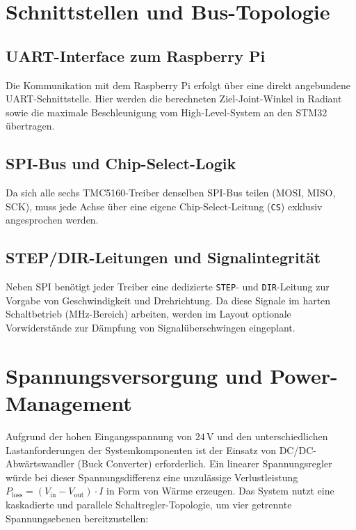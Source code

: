 \section{Schnittstellen und Bus-Topologie}
\label{subsec:schnittstellen}

\subsection{UART-Interface zum Raspberry Pi}
Die Kommunikation mit dem Raspberry Pi erfolgt über eine direkt angebundene UART-Schnittstelle. Hier werden die berechneten Ziel-Joint-Winkel in Radiant sowie die maximale Beschleunigung vom High-Level-System an den STM32 übertragen.

\subsection{SPI-Bus und Chip-Select-Logik}
Da sich alle sechs TMC5160-Treiber denselben SPI-Bus teilen (MOSI, MISO, SCK), muss jede Achse über eine eigene Chip-Select-Leitung (\texttt{CS}) exklusiv angesprochen werden.

\subsection{STEP/DIR-Leitungen und Signalintegrität}
Neben SPI benötigt jeder Treiber eine dedizierte \texttt{STEP}- und \texttt{DIR}-Leitung zur Vorgabe von Geschwindigkeit und Drehrichtung. Da diese Signale im harten Schaltbetrieb (MHz-Bereich) arbeiten, werden im Layout optionale Vorwiderstände zur Dämpfung von Signalüberschwingen eingeplant.\cite{power}

\section{Spannungsversorgung und Power-Management}
\label{subsec:power}

Aufgrund der hohen Eingangsspannung von $24\,\text{V}$ und den unterschiedlichen Lastanforderungen der Systemkomponenten ist der Einsatz von DC/DC-Abwärtswandler (Buck Converter) erforderlich. Ein linearer Spannungsregler würde bei dieser Spannungsdifferenz eine unzulässige Verlustleistung $P_{\text{loss}} = (V_{\text{in}} - V_{\text{out}}) \cdot I$ in Form von Wärme erzeugen. Das System nutzt eine kaskadierte und parallele Schaltregler-Topologie, um vier getrennte Spannungsebenen bereitzustellen:\cite{kirasich_new}

